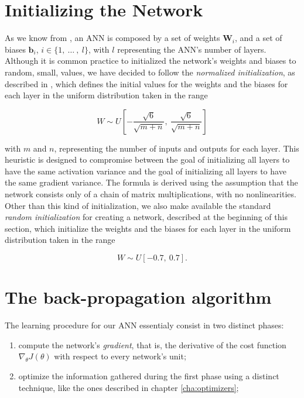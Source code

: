 	\section{Initializing the Network} %
	\label{sec:initializing_the_network}
		As we know from \cite{Goodfellow-et-al-2016,haykin2009neural,mitchell1997machine}, an ANN is composed by
		a set of weights $\mathbf{W}_{i}$, and a set of biases $\mathbf{b}_{i}$,
		$i \in \{ 1, \ \ldots \ , \ l \}$, with $l$ representing the ANN's number of layers. Although it is common
		practice to initialized the network's weights and biases to random, small, values, we have decided to
		follow the \textit{normalized initialization}, as described in \cite{Glorot10understandingthe}, which
		defines the initial values for the weights and the biases for each layer in the uniform distribution
		taken in the range

		\begin{equation*}
		    W \sim U \left [ -\frac{\sqrt{6}}{\sqrt{m + n}}, \ \frac{\sqrt{6}}{\sqrt{m + n}} \right ]
		\end{equation*}

		with $m$ and $n$, representing the number of inputs and outputs for each layer. This heuristic is
		designed to compromise between the goal of initializing all layers to have the same activation variance
		and the goal of initializing all layers to have the same gradient variance. The formula is derived using
		the assumption that the network consists only of a chain of matrix multiplications, with no
		nonlinearities. Other than this kind of initialization, we also make available the standard
		\textit{random initialization} for creating a network, described at the beginning of this section, which
		initialize the weights and the biases for each layer in the uniform distribution taken in the range

		\begin{equation*}
		    W \sim U \left [ - 0.7, \ 0.7 \right ].
		\end{equation*}

	\section{The back-propagation algorithm} %
	\label{sec:the_back-propagation_algorithm}
		The learning procedure for our ANN essentialy consist in two distinct phases:

		\begin{enumerate}
			\item compute the network's \textit{gradient}, that is, the derivative of the cost function
			$\nabla_{\theta} J(\theta)$ with respect to every network's unit;
			\item optimize the information gathered during the first phase using a distinct technique, like the
			ones described in chapter \ref{cha:optimizers};
		\end{enumerate}

